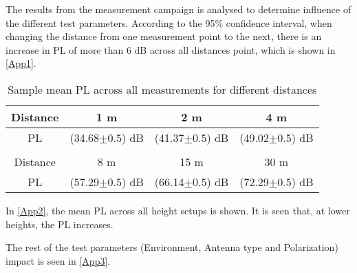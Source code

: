 
The results from the measurement campaign is analysed to determine influence of the different test parameters. According to the 95\% confidence interval, when changing the distance from one measurement point to the next, there is an increase in PL of more than 6 dB across all distances point, which is shown in \autoref{App1}.

\begin{table}[!htbp]
\centering
\caption{Sample mean PL across all measurements for different distances}
\label{App1}
\begin{tabular}{|c|c|c|c|}
\hline
Distance    & 1 m & 2 m& 4 m\\\hline
PL & (34.68$\pm 0.5$) dB & (41.37$\pm 0.5$) dB & (49.02$\pm 0.5$) dB  \\\hline
\multicolumn{4}{c}{}\\\hline
Distance	&8 m& 15 m& 30 m\\\hline
PL &	(57.29$\pm 0.5$) dB & (66.14$\pm 0.5$) dB & (72.29$\pm 0.5$) dB \\\hline
\end{tabular}
\end{table}



In \autoref{App2}, the mean PL across all height setups is shown. It is seen that, at lower heights, the PL increases.

\begin{table}[H]
\centering
\caption{Sample mean PL across all measurements for different height combinations}
\label{App2}
\end{table}


The rest of the test parameters (Environment, Antenna type and Polarization) impact is seen in \autoref{App3}. 

